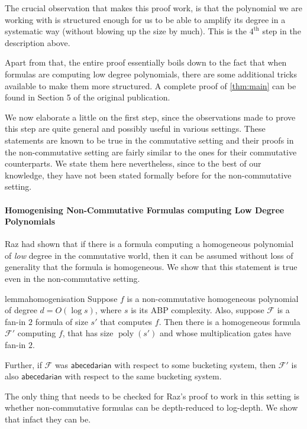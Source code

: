 \documentclass[10pt,a4paper]{article}
\def\poly{\operatorname{poly}}
\newcommand{\form}{\textbf{$\mathcal{F}$}}
\newcommand{\abcd}{\mathsf{abecedarian}}
\begin{document}
\noindent The crucial observation that makes this proof work, is that the polynomial we are working with is structured enough for us to be able to amplify its degree in a systematic way (without blowing up the size by much).
This is the $4^{\text{th}}$ step in the description above.

Apart from that, the entire proof essentially boils down to the fact that when formulas are computing low degree polynomials, there are some additional tricks available to make them more structured.
A complete proof of \autoref{thm:main} can be found in Section 5 of the original publication.

We now elaborate a little on the first step, since the observations made to prove this step are quite general and possibly useful in various settings.
These statements are known to be true in the commutative setting and their proofs in the non-commutative setting are fairly similar to the ones for their commutative counterparts.
We state them here nevertheless, since to the best of our knowledge, they have not been stated formally before for the non-commutative setting.

\paragraph*{Homogenising Non-Commutative Formulas computing Low Degree Polynomials}

Raz \cite{R13} had shown that if there is a formula computing a homogeneous polynomial of \emph{low} degree in the commutative world, then it can be assumed without loss of generality that the formula is homogeneous.
We show that this statement is true even in the non-commutative setting. 

\begin{restatable}{lemma}{homogenisation}\label{lem:homogenisation}
	Suppose $f$ is a non-commutative homogeneous polynomial of degree $d = O(\log s)$, where $s$ is its ABP complexity. 
	Also, suppose $\form$ is a fan-in $2$ formula of size $s'$ that computes $f$.
	Then there is a homogeneous formula $\form'$ computing $f$, that has size $\poly(s')$ and whose multiplication gates have fan-in $2$.

	Further, if $\form$ was $\abcd$ with respect to some bucketing system, then $\form'$ is also $\abcd$ with respect to the same bucketing system.
\end{restatable}

The only thing that needs to be checked for Raz's proof to work in this setting is whether non-commutative formulas can be depth-reduced to log-depth.
We show that infact they can be.
\end{document}
